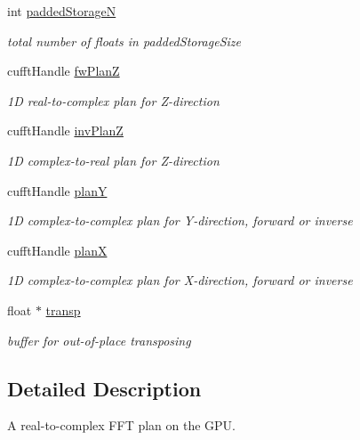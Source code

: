 \begin{DoxyCompactItemize}
int \hyperlink{structgpuFFT3dPlan_a3e5e57c4d604400177e9d88954375640}{paddedStorageN}
\begin{DoxyCompactList}\small\item\em total number of floats in paddedStorageSize \item\end{DoxyCompactList}\item 
cufftHandle \hyperlink{structgpuFFT3dPlan_a064f70e01a88af56749d1503be7e15e2}{fwPlanZ}
\begin{DoxyCompactList}\small\item\em 1D real-\/to-\/complex plan for Z-\/direction \item\end{DoxyCompactList}\item 
cufftHandle \hyperlink{structgpuFFT3dPlan_abdfef776f10427496514c746f14eb67e}{invPlanZ}
\begin{DoxyCompactList}\small\item\em 1D complex-\/to-\/real plan for Z-\/direction \item\end{DoxyCompactList}\item 
cufftHandle \hyperlink{structgpuFFT3dPlan_a21ee894929ab629c48d1272250b752d1}{planY}
\begin{DoxyCompactList}\small\item\em 1D complex-\/to-\/complex plan for Y-\/direction, forward or inverse \item\end{DoxyCompactList}\item 
cufftHandle \hyperlink{structgpuFFT3dPlan_a89812c2651a2240407ea83404c489265}{planX}
\begin{DoxyCompactList}\small\item\em 1D complex-\/to-\/complex plan for X-\/direction, forward or inverse \item\end{DoxyCompactList}\item 
float $\ast$ \hyperlink{structgpuFFT3dPlan_af3ef02885f6804f4b30f06b333550d81}{transp}
\begin{DoxyCompactList}\small\item\em buffer for out-\/of-\/place transposing \item\end{DoxyCompactList}\end{DoxyCompactItemize}


\subsection{Detailed Description}
A real-\/to-\/complex FFT plan on the GPU. 

